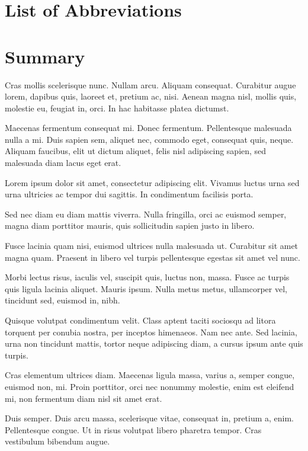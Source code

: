 \documentclass[12pt,reqno,oneside]{amsbook}
\theoremstyle{definition}
\begin{document}
\tableofcontents
\listoffigures
\listoftables

\chapter*{List of Abbreviations}


\chapter*{Summary}

Cras mollis scelerisque nunc. Nullam arcu. Aliquam consequat. Curabitur augue lorem, dapibus quis, laoreet et, pretium ac, nisi. Aenean magna nisl, mollis quis, molestie eu, feugiat in, orci. In hac habitasse platea dictumst.

Maecenas fermentum consequat mi. Donec fermentum. Pellentesque malesuada nulla a mi. Duis sapien sem, aliquet nec, commodo eget, consequat quis, neque. Aliquam faucibus, elit ut dictum aliquet, felis nisl adipiscing sapien, sed malesuada diam lacus eget erat.

Lorem ipsum dolor sit amet, consectetur adipiscing elit. Vivamus luctus urna sed urna ultricies ac tempor dui sagittis. In condimentum facilisis porta.

Sed nec diam eu diam mattis viverra. Nulla fringilla, orci ac euismod semper, magna diam porttitor mauris, quis sollicitudin sapien justo in libero.

Fusce lacinia quam nisi, euismod ultrices nulla malesuada ut. Curabitur sit amet magna quam. Praesent in libero vel turpis pellentesque egestas sit amet vel nunc.

Morbi lectus risus, iaculis vel, suscipit quis, luctus non, massa. Fusce ac turpis quis ligula lacinia aliquet. Mauris ipsum. Nulla metus metus, ullamcorper vel, tincidunt sed, euismod in, nibh.

Quisque volutpat condimentum velit. Class aptent taciti sociosqu ad litora torquent per conubia nostra, per inceptos himenaeos. Nam nec ante. Sed lacinia, urna non tincidunt mattis, tortor neque adipiscing diam, a cursus ipsum ante quis turpis.

Cras elementum ultrices diam. Maecenas ligula massa, varius a, semper congue, euismod non, mi. Proin porttitor, orci nec nonummy molestie, enim est eleifend mi, non fermentum diam nisl sit amet erat.

Duis semper. Duis arcu massa, scelerisque vitae, consequat in, pretium a, enim. Pellentesque congue. Ut in risus volutpat libero pharetra tempor. Cras vestibulum bibendum augue.
\end{document}
